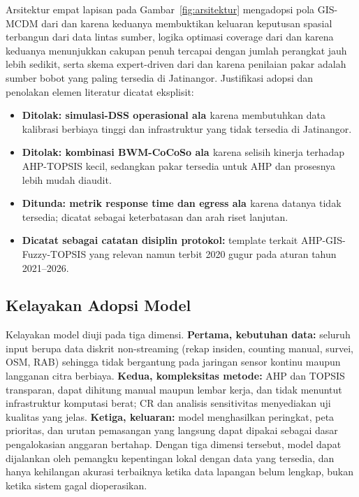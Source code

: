 \documentclass[conference]{IEEEtran}
\begin{document}
Arsitektur empat lapisan pada Gambar~\ref{fig:arsitektur} mengadopsi pola GIS-MCDM dari \cite{feizizadeh2025} dan \cite{kabashkin2025} karena keduanya membuktikan keluaran keputusan spasial terbangun dari data lintas sumber, logika optimasi coverage dari \cite{wang2025} dan \cite{yuhang2025} karena keduanya menunjukkan cakupan penuh tercapai dengan jumlah perangkat jauh lebih sedikit, serta skema expert-driven dari \cite{ahmed2022} dan \cite{baddour2026} karena penilaian pakar adalah sumber bobot yang paling tersedia di Jatinangor. Justifikasi adopsi dan penolakan elemen literatur dicatat eksplisit:

\begin{itemize}
\item \textbf{Ditolak: simulasi-DSS operasional ala \cite{gonzalez2024}} karena membutuhkan data kalibrasi berbiaya tinggi dan infrastruktur yang tidak tersedia di Jatinangor.
\item \textbf{Ditolak: kombinasi BWM-CoCoSo ala \cite{baddour2026}} karena selisih kinerja terhadap AHP-TOPSIS kecil, sedangkan pakar tersedia untuk AHP dan prosesnya lebih mudah diaudit.
\item \textbf{Ditunda: metrik response time dan egress ala \cite{gonzalez2024}} karena datanya tidak tersedia; dicatat sebagai keterbatasan dan arah riset lanjutan.
\item \textbf{Dicatat sebagai catatan disiplin protokol:} template terkait AHP-GIS-Fuzzy-TOPSIS yang relevan namun terbit 2020 gugur pada aturan tahun 2021--2026.
\end{itemize}

\subsection{Kelayakan Adopsi Model}

Kelayakan model diuji pada tiga dimensi. \textbf{Pertama, kebutuhan data:} seluruh input berupa data diskrit non-streaming (rekap insiden, counting manual, survei, OSM, RAB) sehingga tidak bergantung pada jaringan sensor kontinu maupun langganan citra berbiaya. \textbf{Kedua, kompleksitas metode:} AHP dan TOPSIS transparan, dapat dihitung manual maupun lembar kerja, dan tidak menuntut infrastruktur komputasi berat; CR dan analisis sensitivitas menyediakan uji kualitas yang jelas. \textbf{Ketiga, keluaran:} model menghasilkan peringkat, peta prioritas, dan urutan pemasangan yang langsung dapat dipakai sebagai dasar pengalokasian anggaran bertahap. Dengan tiga dimensi tersebut, model dapat dijalankan oleh pemangku kepentingan lokal dengan data yang tersedia, dan hanya kehilangan akurasi terbaiknya ketika data lapangan belum lengkap, bukan ketika sistem gagal dioperasikan.
\end{document}
